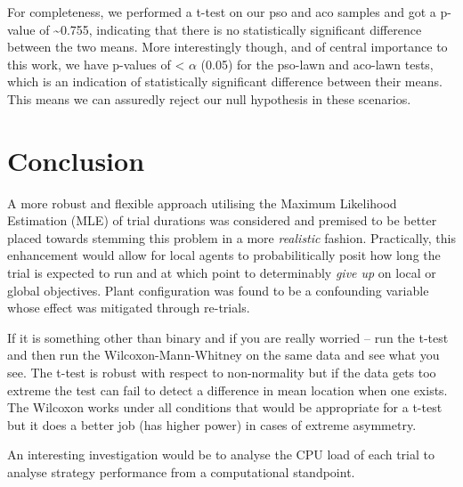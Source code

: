 \documentclass{report}
\begin{document}
    For completeness, we performed a t-test on our pso and aco samples and
got a p-value of \textasciitilde{}0.755, indicating that there is no
statistically significant difference between the two means. More
interestingly though, and of central importance to this work, we have
p-values of \textless{} \(\alpha\) (0.05) for the pso-lawn and aco-lawn
tests, which is an indication of statistically significant difference
between their means. This means we can assuredly reject our null
hypothesis in these scenarios.


\chapter{Conclusion} \label{conclusion}
A more robust and flexible approach utilising the Maximum Likelihood Estimation (MLE) of trial durations was considered and premised to be better placed towards stemming this problem in a more \textit{realistic} fashion. Practically, this enhancement would allow for local agents to probabilitically posit how long the trial is expected to run and at which point to determinably \textit{give up} on local or global objectives. Plant configuration was found to be a confounding variable whose effect was mitigated through re-trials.

If it is something other than binary and if you are really worried – run the t-test and then run the Wilcoxon-Mann-Whitney on the same data and see what you see. The t-test is robust with respect to non-normality but if the data gets too extreme the test can fail to detect a difference in mean location when one exists. The Wilcoxon works under all conditions that would be appropriate for a t-test but it does a better job (has higher power) in cases of extreme asymmetry.

An interesting investigation would be to analyse the CPU load of each trial to analyse strategy performance from a computational standpoint.
\end{document}
